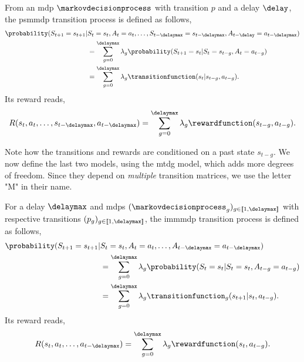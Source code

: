 \begin{defi}
    From an \gls{mdp} $\markovdecisionprocess$ with transition $p$ and a delay $\delay$, the \gls{psmmdp} transition process is defined as follows,
    \begin{align*}
        \probability(S_{t+1}=s_{t+1}\vert& S_{t}=s_{t},A_{t}=a_{t},\dots,S_{t-\delaymax}=s_{t-\delaymax},A_{t-\delay}=a_{t-\delaymax})
        \\
        &=\sum_{g=0}^\delaymax \lambda_g \probability(S_{t+1}=s_t\vert S_{t}=s_{t-g},A_{t}=a_{t-g})
        \\
        &= \sum_{g=0}^\delaymax \lambda_g \transitionfunction(s_t\vert s_{t-g},a_{t-g}).
    \end{align*}
    Its reward reads,
    \begin{align*}
        R(s_{t},a_{t},\dots,s_{t-\delaymax},a_{t-\delaymax}) = \sum_{g=0}^\delaymax \lambda_g \rewardfunction(s_{t-g},a_{t-g}).
    \end{align*}
\end{defi}

Note how the transitions and rewards are conditioned on a past state $s_{t-g}$. 
We now define the last two models, using the \gls{mtdg} model, which adds more degrees of freedom. 
Since they depend on \emph{multiple} transition matrices, we use the letter "M" in their name.

\begin{defi}
    For a delay $\delaymax$ and \glspl{mdp} $(\markovdecisionprocess_g)_{g\in[\![1,\delaymax]\!]}$ with respective transitions $(p_g)_{g\in[\![1,\delaymax]\!]}$, the \gls{immmdp} transition process is defined as follows,
    \begin{align*}
        \probability(S_{t+1}=s_{t+1}\vert& S_{t}=s_{t},A_{t}=a_{t},\dots,A_{t-\delaymax}=a_{t-\delaymax})
        \\
        &=\sum_{g=0}^\delaymax \lambda_g \probability(S_t=s_t\vert S_{t}=s_{t},A_{t-g}=a_{t-g})
        \\
        &= \sum_{g=0}^\delaymax \lambda_g \transitionfunction_g(s_{t+1}\vert s_{t},a_{t-g}).
    \end{align*}
    Its reward reads,
    \begin{align*}
        R(s_{t},a_{t},\dots,a_{t-\delaymax}) = \sum_{g=0}^\delaymax \lambda_g \rewardfunction(s_{t},a_{t-g}).
    \end{align*}
\end{defi}

